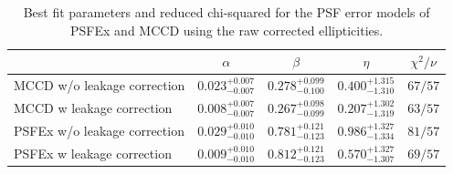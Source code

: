 \begin{table}[h!]
\centering
\begin{tabular}{lcccc}
\hline
\hline
 & $\alpha$ & $\beta$ & $\eta$ & $\chi^2 / \nu$ \\
\hline
MCCD w/o leakage correction & $0.023^{+0.007}_{-0.007}$ & $0.278^{+0.099}_{-0.100}$ & $0.400^{+1.315}_{-1.310}$ & $67/57$ \\
MCCD w leakage correction & $0.008^{+0.007}_{-0.007}$ & $0.267^{+0.098}_{-0.099}$ & $0.207^{+1.302}_{-1.319}$ & $63/57$ \\
PSFEx w/o leakage correction & $0.029^{+0.010}_{-0.010}$ & $0.781^{+0.121}_{-0.123}$ & $0.986^{+1.327}_{-1.334}$ & $81/57$ \\
PSFEx w leakage correction & $0.009^{+0.010}_{-0.010}$ & $0.812^{+0.121}_{-0.123}$ & $0.570^{+1.327}_{-1.307}$ & $69/57$ \\
\hline
\end{tabular}
\caption{Best fit parameters and reduced chi-squared for the PSF error models of PSFEx and MCCD using the raw corrected ellipticities.}
\label{tab:psf_error_model_best_fit}
\end{table}
